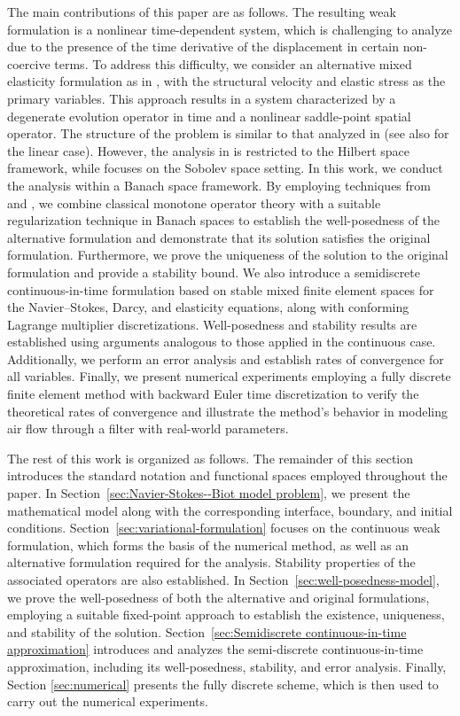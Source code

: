 \documentclass[11pt]{article}
\numberwithin{equation}{section}
\newcommand{\0}{{\mathbf{0}}}
\numberwithin{equation}{section}
\begin{document}
The main contributions of this paper are as follows. The resulting weak formulation is a nonlinear time-dependent system, which is challenging to analyze due to the presence of the time derivative of the displacement in certain non-coercive terms. 
To address this difficulty, we consider an alternative mixed elasticity formulation as in \cite{s2005,aeny2019}, with the structural velocity and elastic stress as the primary variables.
This approach results in a system characterized by a degenerate evolution operator in time and a nonlinear saddle-point spatial operator. 
The structure of the problem is similar to that analyzed in \cite{s2010,aeny2019} (see also \cite{bg2004} for the linear case). 
However, the analysis in \cite{s2010} is restricted to the Hilbert space framework, while \cite{aeny2019} focuses on the Sobolev space setting. 
In this work, we conduct the analysis within a Banach space framework.
By employing techniques from \cite{Showalter} and \cite{cmo2018}, we combine classical monotone operator theory with a suitable regularization technique in Banach spaces to establish the well-posedness of the alternative formulation and demonstrate that its solution satisfies the original formulation. 
Furthermore, we prove the uniqueness of the solution to the original formulation and provide a stability bound.
We also introduce a semidiscrete continuous-in-time formulation based on stable mixed finite element spaces for the Navier--Stokes, Darcy, and elasticity equations, along with conforming Lagrange multiplier discretizations. 
Well-posedness and stability results are established using arguments analogous to those applied in the continuous case. 
Additionally, we perform an error analysis and establish rates of convergence for all variables.
Finally, we present numerical experiments employing a fully discrete finite element method with backward Euler time discretization to verify the theoretical rates of convergence and illustrate the method's behavior in modeling air flow through a filter with real-world parameters.

The rest of this work is organized as follows. 
The remainder of this section introduces the standard notation and functional spaces employed throughout the paper. 
In Section~\ref{sec:Navier-Stokes--Biot model problem}, we present the mathematical model along with the corresponding interface, boundary, and initial conditions. 
Section~\ref{sec:variational-formulation} focuses on the continuous weak formulation, which forms the basis of the numerical method, as well as an alternative formulation required for the analysis. 
Stability properties of the associated operators are also established. 
In Section~\ref{sec:well-posedness-model}, we prove the well-posedness of both the alternative and original formulations, employing a suitable fixed-point approach to establish the existence, uniqueness, and stability of the solution. 
Section~\ref{sec:Semidiscrete continuous-in-time approximation} introduces and analyzes the semi-discrete continuous-in-time approximation, including its well-posedness, stability, and error analysis. 
Finally, Section \ref{sec:numerical} presents the fully discrete scheme, which is then used to carry out the numerical experiments.
\end{document}
